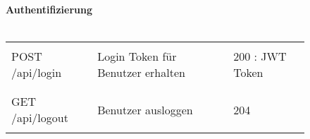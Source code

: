 \newpage

\begin{figure}[H]
	\textbf{Authentifizierung}\\ \\
	\begin{tabularx}{\textwidth}{X | X | X}
		\hline &&\\
		POST /api/login & Login Token für Benutzer erhalten & 200 : JWT Token
		\\&&\\ \hline &&\\
		GET /api/logout & Benutzer ausloggen & 204
		\\&&\\ \hline 
	\end{tabularx}
\end{figure}






